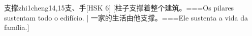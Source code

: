 \begin{EntryWithPhonetic}{支撑}{zhi1cheng1}{4,15}{⽀、⼿}[HSK 6]
  [柱子支撑着整个建筑。===Os pilares sustentam todo o edifício. | 一家的生活由他支撑。===Ele sustenta a vida da família.]
\end{EntryWithPhonetic}

